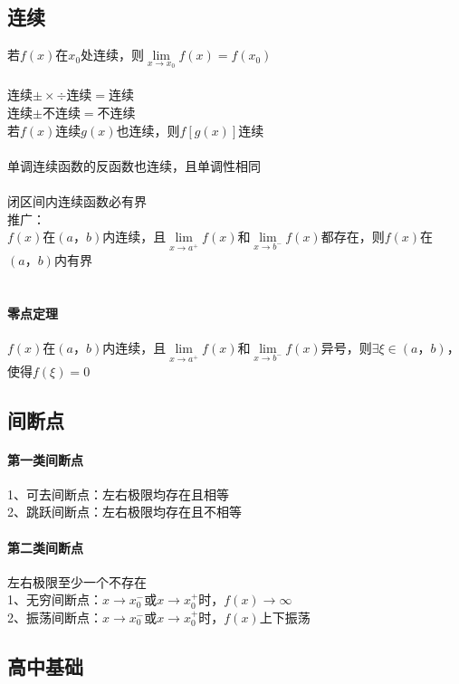 \documentclass{article}
\begin{document}
\begin{flushleft}
\subsection{连续}

若$f(x)$在$x_0$处连续，则$\lim\limits_{x\to x_0} f(x)=f(x_0)$\\
~\\
连续$\pm\times\div$连续$=$连续\\
连续$\pm$不连续$=$不连续\\
若$f(x)$连续$g(x)$也连续，则$f[g(x)]$连续\\
~\\
单调连续函数的反函数也连续，且单调性相同\\
~\\
闭区间内连续函数必有界\\
推广：\\
$f(x)$在$(a，b)$内连续，且$\lim\limits_{x\to a^+} f(x)$和$\lim\limits_{x\to b^-} f(x)$都存在，则$f(x)$在$(a，b)$内有界\\
~\\
\paragraph{零点定理}
$f(x)$在$(a，b)$内连续，且$\lim\limits_{x\to a^+} f(x)$和$\lim\limits_{x\to b^-} f(x)$异号，则$\exists \xi \in (a，b)$，使得$f(\xi)=0$\\

\subsection{间断点}

\paragraph{第一类间断点}
1、可去间断点：左右极限均存在且相等\\
2、跳跃间断点：左右极限均存在且不相等\\
\paragraph{第二类间断点}
左右极限至少一个不存在\\
1、无穷间断点：$x\to x_0^-$或$x\to x_0^+$时，$f(x)\to \infty$\\
2、振荡间断点：$x\to x_0^-$或$x\to x_0^+$时，$f(x)$上下振荡\\

\subsection{高中基础}


\end{flushleft}
\end{document}
